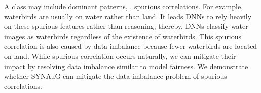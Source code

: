 A class may include dominant patterns, \ie, spurious correlations.
For example, waterbirds are usually on water rather than land.
It leads DNNs to rely heavily on these spurious features rather than reasoning; thereby, DNNs classify water images as waterbirds regardless of the existence of waterbirds.
This spurious correlation is also caused by data imbalance because fewer waterbirds are located on land.
While spurious correlation occurs naturally, we can mitigate their impact by resolving data imbalance
similar to model fairness.
We demonstrate whether SYNAuG can mitigate the data imbalance problem of spurious correlations.



